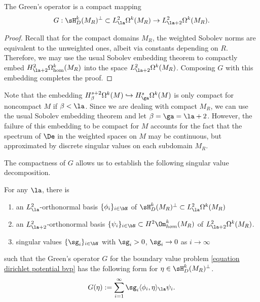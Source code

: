 \documentclass[hidelinks, 12pt, oneside, reqno]{amsart}
\begin{document}
\begin{lem}\label{lemma compactness of Greens}
    The Green's operator is a compact mapping 
    \[
    G: \sH^k_D(M_R)^\perp \subset L^2_{\la}\Omega^k(M_R) \rightarrow L^{2}_{\la +2} \Omega^k (M_R).
    \]
\end{lem}

\begin{proof}
    Recall that for the compact domains $M_R$, the weighted Sobolev norms are equivalent to the unweighted ones, albeit via constants depending on $R$. Therefore, we may use the usual Sobolev embedding theorem to compactly embed $ H^{2}_{\la +2} \Omega^k_{\mathrm{hom}} (M_R)$ into the space $L^2_{\la +2} \Omega^k (M_R)$. Composing $G$ with this embedding completes the proof.
\end{proof}

\begin{rmk}
    Note that the embedding $H^{s+2}_{\beta} \Omega^k(M) \hookrightarrow H^{s}_{\ga} \Omega^k(M)$ is only compact for noncompact $M$ if $\beta < \la$. Since we are dealing with compact $M_R$, we can use the usual Sobolev embedding theorem and let $\beta = \ga = \la + 2$. However, the failure of this embedding to be compact for $M$ accounts for the fact that the spectrum of $\De$ in the weighted spaces on $M$ may be continuous, but approximated by discrete singular values on each subdomain $M_R$.
\end{rmk}

The compactness of $G$ allows us to establish the following singular value decomposition.

\begin{prop}\label{proposition singular value decomp for weighted}
    For any $\la$, there is 
    \begin{enumerate}
        \item an $L^2_{\la}$-orthonormal basis $\{\phi_i\}_{i\in \bN}$ of $\sH^k_D(M_R)^\perp \subset L^2_{\la}\Omega^k(M_R)$
        \item an $L^{2}_{\la + 2}$-orthonormal basis $\{\psi_i\}_{i\in \bN} \subset H^2\Om^k_{hom}(M_R)$ of $L^{2}_{\la + 2}\Omega^k(M_R)$.
        \item singular values $\{\sg_i\}_{i \in \bN}$ with $\sg_i > 0$, $\sg_i \rightarrow 0$ as $i \rightarrow \infty$
    \end{enumerate}  
    such that the Green's operator $G$ for the boundary value problem \eqref{equation dirichlet potential bvp} has the following form for $\eta \in \sH^k_D(M_R)^\perp$.
    \begin{equation}\label{equation SVD for greens function}
        G(\eta) := \sum_{i=1}^\infty \sg_i \langle \phi_i, \eta \rangle_\la \psi_i.
    \end{equation}
\end{prop}
\end{document}
